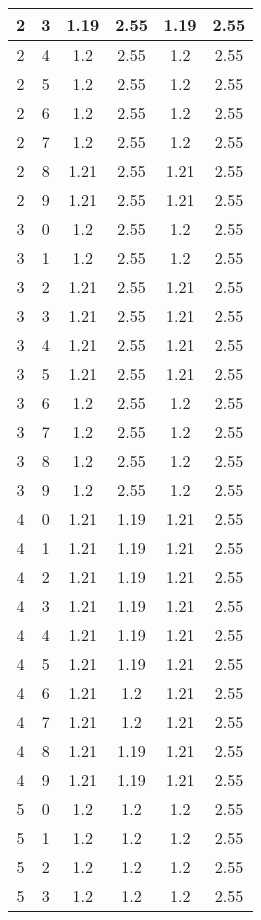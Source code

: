 \begin{longtable}{|c|c||c||c||c|c|}
	2 & 3 & 1.19 & 2.55 & 1.19 & 2.55 \\ \hline
	2 & 4 & 1.2 & 2.55 & 1.2 & 2.55 \\ \hline
	2 & 5 & 1.2 & 2.55 & 1.2 & 2.55 \\ \hline
	2 & 6 & 1.2 & 2.55 & 1.2 & 2.55 \\ \hline
	2 & 7 & 1.2 & 2.55 & 1.2 & 2.55 \\ \hline
	2 & 8 & 1.21 & 2.55 & 1.21 & 2.55 \\ \hline
	2 & 9 & 1.21 & 2.55 & 1.21 & 2.55 \\ \hline
	3 & 0 & 1.2 & 2.55 & 1.2 & 2.55 \\ \hline
	3 & 1 & 1.2 & 2.55 & 1.2 & 2.55 \\ \hline
	3 & 2 & 1.21 & 2.55 & 1.21 & 2.55 \\ \hline
	3 & 3 & 1.21 & 2.55 & 1.21 & 2.55 \\ \hline
	3 & 4 & 1.21 & 2.55 & 1.21 & 2.55 \\ \hline
	3 & 5 & 1.21 & 2.55 & 1.21 & 2.55 \\ \hline
	3 & 6 & 1.2 & 2.55 & 1.2 & 2.55 \\ \hline
	3 & 7 & 1.2 & 2.55 & 1.2 & 2.55 \\ \hline
	3 & 8 & 1.2 & 2.55 & 1.2 & 2.55 \\ \hline
	3 & 9 & 1.2 & 2.55 & 1.2 & 2.55 \\ \hline
	4 & 0 & 1.21 & 1.19 & 1.21 & 2.55 \\ \hline
	4 & 1 & 1.21 & 1.19 & 1.21 & 2.55 \\ \hline
	4 & 2 & 1.21 & 1.19 & 1.21 & 2.55 \\ \hline
	4 & 3 & 1.21 & 1.19 & 1.21 & 2.55 \\ \hline
	4 & 4 & 1.21 & 1.19 & 1.21 & 2.55 \\ \hline
	4 & 5 & 1.21 & 1.19 & 1.21 & 2.55 \\ \hline
	4 & 6 & 1.21 & 1.2 & 1.21 & 2.55 \\ \hline
	4 & 7 & 1.21 & 1.2 & 1.21 & 2.55 \\ \hline
	4 & 8 & 1.21 & 1.19 & 1.21 & 2.55 \\ \hline
	4 & 9 & 1.21 & 1.19 & 1.21 & 2.55 \\ \hline
	5 & 0 & 1.2 & 1.2 & 1.2 & 2.55 \\ \hline
	5 & 1 & 1.2 & 1.2 & 1.2 & 2.55 \\ \hline
	5 & 2 & 1.2 & 1.2 & 1.2 & 2.55 \\ \hline
	5 & 3 & 1.2 & 1.2 & 1.2 & 2.55 \\ \hline

\end{longtable}
